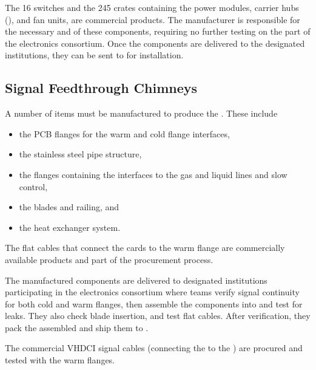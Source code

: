The  \num{16}  switches and the \num{245}  crates containing the power modules, carrier hubs (), and fan units, are commercial products. The manufacturer is responsible for the necessary  and   of these components, requiring no further testing on the part of the \dual electronics consortium. Once the components are delivered to the designated institutions, they can be sent to  for installation. 


\subsection{Signal Feedthrough Chimneys}
\label{ssec:dp-tpcelec-prod-sft}

A number of items must be manufactured to produce the . These include 
\begin{itemize}
\item the PCB flanges for the warm and cold \fdth flange interfaces, 
\item the stainless steel pipe structure, 
\item the flanges containing the interfaces to the gas and liquid lines and slow control, 
\item the blades and railing, and 
\item the heat exchanger system. 
\end{itemize}
The flat cables that connect the  cards to the warm flange are commercially available products and part of the  procurement process. 

The manufactured components are delivered to designated institutions participating in the \dual electronics consortium where teams verify signal continuity for both cold and warm flanges, then assemble the components into  and test for leaks. They also check blade insertion, and test flat cables.%
After verification, they pack the assembled  and ship them to . 

The commercial VHDCI signal cables (connecting the  to the ) are procured and tested with the  warm flanges.


